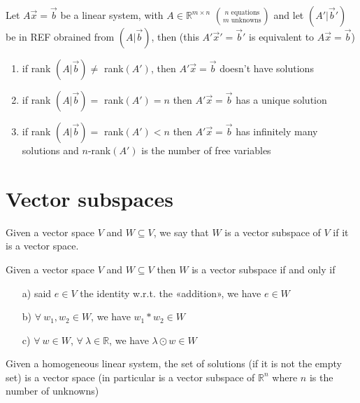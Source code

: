 \begin{theorem}
    Let $A\vec x = \vec b$ be a linear system, with $A \in \mathbb{R}^{m \times n}$ $\binom{n \text{ equations}}{m \text{ unknowns}}$ and let $\left( A'|\vec b' \right)$ be in REF obrained from $\left(A | \vec b\right)$, then (this $A'\vec x' = \vec b' $ is equivalent to $A \vec x = \vec b$)
    \begin{enumerate}
        \item if rank $\left(A | \vec b\right) \ne$ rank$\left(A'\right)$, then $A'\vec x = \vec b$ doesn't have solutions 
        \item if rank $\left(A | \vec b\right) =$ rank$\left(A'\right) = n$ then $A'\vec x = \vec b$ has a unique solution
        \item if rank $\left(A | \vec b\right) =$ rank$\left(A'\right) < n$ then $A'\vec x = \vec b$ has infinitely many solutions and $n$-rank$(A')$ is the number of free variables 
    \end{enumerate}
\end{theorem}

\section{Vector subspaces}
Given a vector space $V$ and $W \subseteq V$, we say that $W$ is a vector subspace of $V$ if it is a vector space.

Given a vector space $V$ and $W \subseteq V$ then $W$ is a vector subspace if and only if
\begin{itemize}
    \item[a)] said $e \in V$ the identity w.r.t. the «addition», we have $e \in W$
    \item[b)] $\forall \ w_1, w_2 \in W$, we have $w_1 * w_2 \in W$
    \item[c)] $\forall \ w \in W$, $\forall \ \lambda \in \mathbb{R}$, we have $\lambda \odot w \in W$ 
\end{itemize}
Given a homogeneous linear system, the set of solutions (if it is not the empty set) is a vector space (in particular is a vector subspace of $\mathbb{R}^n$ where $n$ is the number of unknowns)

